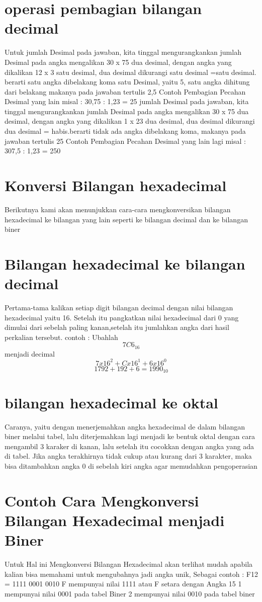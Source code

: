 \documentclass{article}
\begin{document}
\section{operasi pembagian bilangan decimal}
Untuk jumlah Desimal pada jawaban, kita tinggal mengurangkankan jumlah Desimal pada angka mengalikan 30 x 75 dua desimal, 
dengan angka yang dikalikan 12 x 3 satu desimal, 
dua desimal dikurangi satu desimal =satu desimal. berarti satu angka dibelakang koma satu Desimal, yaitu 5, satu angka dihitung dari belakang makanya pada jawaban tertulis 2,5
 Contoh Pembagian Pecahan Desimal yang lain misal : 
 30,75 : 1,23 = 25
jumlah Desimal pada jawaban, kita tinggal mengurangkankan jumlah Desimal pada angka mengalikan 30 x 75 dua desimal, 
dengan angka yang dikalikan 1 x 23 dua desimal, 
dua desimal dikurangi dua desimal = habis.berarti tidak ada angka dibelakang koma, makanya pada jawaban tertulis 25
 Contoh Pembagian Pecahan Desimal yang lain lagi misal : 
 307,5 : 1,23 = 250
\section{Konversi Bilangan hexadecimal}
Berikutnya kami akan menunjukkan cara-cara mengkonversikan bilangan hexadecimal ke bilangan yang lain seperti ke bilangan decimal dan ke bilangan biner
\section{Bilangan hexadecimal ke bilangan decimal}
Pertama-tama kalikan setiap digit bilangan decimal dengan nilai bilangan hexadecimal yaitu 16. Setelah itu pangkatkan nilai hexadecimal dari 0 yang dimulai dari sebelah paling kanan,setelah itu jumlahkan angka dari hasil perkalian tersebut.
contoh : 
Ubahlah \[ 7C6_16 \] menjadi decimal
		\[ 7 x 16^2 + C x 16^1 + 6 x 16^0\]
		\[ 1792 + 192 + 6 = 1990_10 \]

\section{bilangan hexadecimal ke oktal}
Caranya, yaitu dengan menerjemahkan angka hexadecimal de dalam bilangan biner melalui tabel, lalu diterjemahkan lagi menjadi ke bentuk oktal dengan cara mengambil 3 karaker di kanan, lalu setelah itu cocokkan dengan angka yang ada di tabel. Jika angka terakhirnya tidak cukup atau kurang dari 3 karakter, maka bisa ditambahkan angka 0 di sebelah kiri angka agar memudahkan pengoperasian

\section{Contoh Cara Mengkonversi Bilangan Hexadecimal menjadi Biner}
 Untuk Hal ini Mengkonversi Bilangan Hexadecimal akan terlihat mudah apabila kalian bisa memahami untuk mengubahnya jadi angka unik, Sebagai contoh :
 F12 = 1111 0001 0010
 F mempunyai nilai 1111 atau F setara dengan Angka 15
 1 mempunyai nilai 0001 pada tabel Biner
 2 mempunyai nilai 0010 pada tabel biner
 
\end{document}
